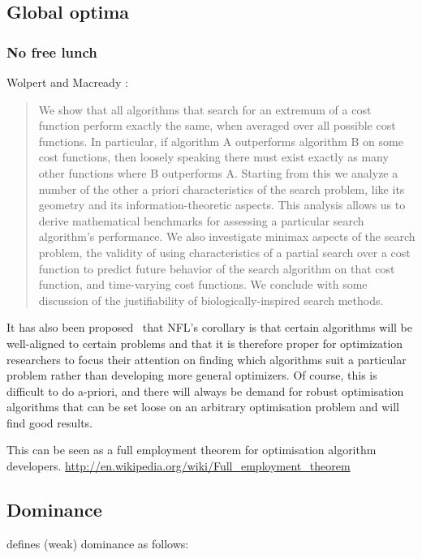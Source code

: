 \subsection{Global optima}

\subsubsection{No free lunch}
Wolpert and Macready \citehere:

\begin{quote}
  We show that all algorithms that search for an extremum of a cost function perform exactly the same, when averaged over all possible cost functions. In particular, if algorithm A outperforms algorithm B on some cost functions, then loosely speaking there must exist exactly as many other functions where B outperforms A.
Starting from this we analyze a number of the other a priori characteristics of the search problem, like its geometry and its information-theoretic aspects.
This analysis allows us to derive mathematical benchmarks for assessing a particular search algorithm's performance.
We also investigate minimax aspects of the search problem, the validity of using characteristics of a partial search over a cost function to predict future behavior of the search algorithm on that cost function, and time-varying cost functions.
We conclude with some discussion of the justifiability of biologically-inspired search methods.
\end{quote}

It has also been proposed \citehere\ that NFL's corollary is that certain algorithms will be well-aligned to certain problems and that it is therefore proper for optimization researchers to focus their attention on finding which algorithms suit a particular problem rather than developing more general optimizers. Of course, this is difficult to do a-priori, and there will always be demand for robust optimisation algorithms that can be set loose on an arbitrary optimisation problem and will find good results.

This can be seen as a full employment theorem for optimisation algorithm developers. \url{http://en.wikipedia.org/wiki/Full_employment_theorem}

\subsection{Dominance}
\citet[28]{deb.kalyanmoy2001multi-objective} defines (weak) dominance as follows:

